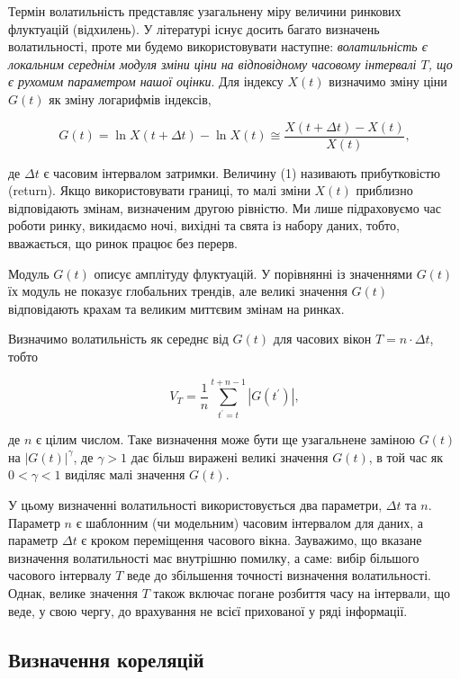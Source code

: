 \documentclass[
  letterpaper,
]{report}
\begin{document}
Термін волатильність представляє узагальнену міру величини ринкових
флуктуацій (відхилень). У літературі існує досить багато визначень
волатильності, проте ми будемо використовувати наступне:
\emph{волатильність є локальним середнім модуля зміни ціни на
відповідному часовому інтервалі \(T\), що є рухомим параметром нашої
оцінки}. Для індексу \(X(t)\) визначимо зміну ціни \(G(t)\) як зміну
логарифмів індексів,

\[
G(t) = \ln{X(t+\Delta t) - \ln{X(t)}} \cong \frac{X(t+\Delta t) - X(t)}{X(t)}, \tag{1} 
\]

де \(\Delta t\) є часовим інтервалом затримки. Величину (1) називають
прибутковістю (return). Якщо використовувати границі, то малі зміни
\(X(t)\) приблизно відповідають змінам, визначеним другою рівністю. Ми
лише підраховуємо час роботи ринку, викидаємо ночі, вихідні та свята із
набору даних, тобто, вважається, що ринок працює без перерв.

Модуль \(G(t)\) описує амплітуду флуктуацій. У порівнянні із значеннями
\(G(t)\) їх модуль не показує глобальних трендів, але великі значення
\(G(t)\) відповідають крахам та великим миттєвим змінам на ринках.

Визначимо волатильність як середнє від \(G(t)\) для часових вікон
\(T = n \cdot \Delta t\), тобто

\[
V_{T} = \frac{1}{n}\sum_{t^{'}=t}^{t+n-1}\left| G(t^{'}) \right|, \tag{2}
\]

де \(n\) є цілим числом. Таке визначення може бути ще узагальнене
заміною \(G(t)\) на \(\left| G(t) \right|^{\gamma}\), де \(\gamma > 1\)
дає більш виражені великі значення \(G(t)\), в той час як
\(0 < \gamma < 1\) виділяє малі значення \(G(t)\).

У цьому визначенні волатильності використовується два параметри,
\(\Delta t\) та \(n\). Параметр \(n\) є шаблонним (чи модельним) часовим
інтервалом для даних, а параметр \(\Delta t\) є кроком переміщення
часового вікна. Зауважимо, що вказане визначення волатильності має
внутрішню помилку, а саме: вибір більшого часового інтервалу \(T\) веде
до збільшення точності визначення волатильності. Однак, велике значення
\(T\) також включає погане розбиття часу на інтервали, що веде, у свою
чергу, до врахування не всієї прихованої у ряді інформації.

\hypertarget{ux432ux438ux437ux43dux430ux447ux435ux43dux43dux44f-ux43aux43eux440ux435ux43bux44fux446ux456ux439}{%
\subsection{Визначення
кореляцій}\label{ux432ux438ux437ux43dux430ux447ux435ux43dux43dux44f-ux43aux43eux440ux435ux43bux44fux446ux456ux439}}
\end{document}
